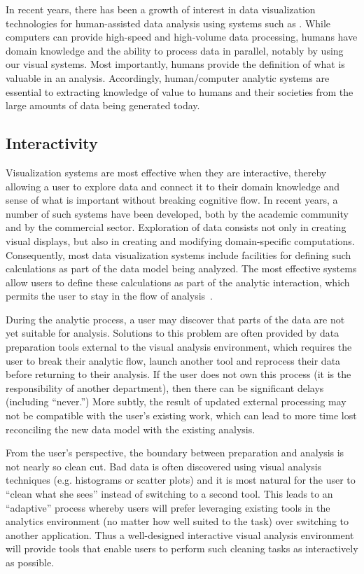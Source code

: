In recent years, there has been a growth of interest in data visualization technologies for human-assisted data analysis using systems such as \cite{Stolte:2008,Qlik,Ahlberg:1996}. While computers can provide high-speed and high-volume data processing, humans have domain knowledge and the ability to process data in parallel, notably by using our visual systems. Most importantly, humans provide the definition of what is valuable in an analysis. Accordingly, human/computer analytic systems are essential to extracting knowledge of value to humans and their societies from the large amounts of data being generated today.

\subsection{Interactivity}
Visualization systems are most effective when they are interactive, thereby allowing a user to explore data and connect it to their domain knowledge and sense of what is important without breaking cognitive flow. In recent years, a number of such systems have been developed, both by the academic community and by the commercial sector. Exploration of data consists not only in creating visual displays, but also in creating and modifying domain-specific computations. Consequently, most data visualization systems include facilities for defining such calculations as part of the data model being analyzed. The most effective systems allow users to define these calculations as part of the analytic interaction, which permits the user to stay in the flow of analysis~\cite{Morton:2012}.

During the analytic process, a user may discover that parts of the data are not yet suitable for analysis. Solutions to this problem are often provided by data preparation tools external to the visual analysis environment, which requires the user to break their analytic flow, launch another tool and reprocess their data before returning to their analysis. If the user does not own this process (\eg it is the responsibility of another department), then there can be significant delays (including ``never.'') More subtly, the result of updated external processing may not be compatible with the user's existing work, which can lead to more time lost reconciling the new data model with the existing analysis.

From the user's perspective, the boundary between preparation and analysis is not nearly so clean cut. Bad data is often discovered using visual analysis techniques (e.g. histograms or scatter plots) and it is most natural for the user to ``clean what she sees'' instead of switching to a second tool. This leads to an ``adaptive'' process whereby users will prefer leveraging existing tools in the analytics environment (no matter how well suited to the task) over switching to another application. Thus a well-designed interactive visual analysis environment will provide tools that enable users to perform such cleaning tasks as interactively as possible.

